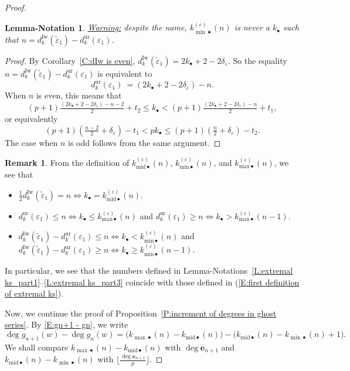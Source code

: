 \documentclass[12pt]{amsart}
\newtheorem{lemmanotation}[subsection]{Lemma-Notation}
\theoremstyle{definition}
\newtheorem{remark}[subsection]{Remark}
\numberwithin{equation}{subsection}
\def\bfe{\mathbf{e}}
\newcommand{\Iw}{\mathrm{Iw}}
\newcommand{\unr}{\mathrm{ur}}
\newcommand{\ur}{\mathrm{ur}}
\newcommand{\midd}{\mathrm{mid}}
\begin{document}
\begin{proof}
\begin{lemmanotation}
\emph{\underline{Warning:} despite the name, $k_{{\min}\bullet}^{(\varepsilon)}(n)$ is never  a $k_\bullet$ such that $n = d_{k}^\Iw(\tilde \varepsilon_1) - d_{k}^\unr(\varepsilon_1)$.}
\end{lemmanotation}
\begin{proof}
By Corollary~\ref{C:dIw is even}, $d_{k}^{\Iw}(\tilde \varepsilon_1) = 2k_\bullet + 2-2\delta_\varepsilon$. So the equality $n = d_{k}^\Iw(\tilde \varepsilon_1)-d_{k}^\unr(\varepsilon_1)$ is equivalent to
$$
d_{k}^\unr(\varepsilon_1)\ =  (2k_\bullet+2-2\delta_\varepsilon)-n.
$$
When $n$ is even, this means that
$$(p+1)\tfrac { (2k_\bullet+2-2\delta_\varepsilon)-n-2}2 + t_2 \leq k_\bullet  < (p+1)\tfrac {(2k_\bullet+2-2\delta_\varepsilon)-n}2 + t_1,
$$
or equivalently
$$ (p+1)( \tfrac {n-2}2 + \delta_\varepsilon) -t_1 < pk_\bullet  \leq (p+1)( \tfrac n2 + \delta_\varepsilon)  -t_2.
$$
The case when $n$ is odd follows from the same argument.
\end{proof}
\begin{remark}
\label{R:meaning of kmidminmax}
From the definition of $k_{\mathrm{mid}\bullet}^{(\varepsilon)}(n)$, $k_{\mathrm{min}\bullet}^{(\varepsilon)}(n)$, and $k^{(\varepsilon)}_{\mathrm{max} \bullet}(n)$, we see that
\begin{itemize}
\item $\frac 12d_k^\Iw(\tilde \varepsilon_1) = n \Leftrightarrow k_\bullet = k_{\mathrm{mid}\bullet}^{(\varepsilon)}(n)$.
\item $d_k^\ur(\varepsilon_1) \leq  n \Leftrightarrow k_\bullet \leq k_{\mathrm{max}\bullet}^{(\varepsilon)}(n)$ and $d_k^\ur(\varepsilon_1) \geq   n \Leftrightarrow k_\bullet > k_{\mathrm{max}\bullet}^{(\varepsilon)}(n-1)$.
\item 
$d_k^\Iw(\tilde \varepsilon_1) - d_k^\ur(\varepsilon_1) \leq  n \Leftrightarrow k_\bullet < k_{\mathrm{min}\bullet}^{(\varepsilon)}(n)$ and $d_k^\Iw(\tilde \varepsilon_1) -d_k^\ur(\varepsilon_1) \geq   n \Leftrightarrow k_\bullet \geq k_{\mathrm{min}\bullet}^{(\varepsilon)}(n-1)$.
\end{itemize}
In particular, we see that the numbers defined in Lemma-Notations~\ref{L:extremal ks_part1}--\ref{L:extremal ks_part3} coincide with those defined in (\ref{E:first definition of extremal ks}).
\end{remark}

Now, we continue the proof of Proposition~\ref{P:increment of degrees in ghost series}.  By \eqref{E:gn+1 - gn}, we write
$$
\deg g_{n+1}(w) - \deg g_n(w) = \big(k_{{\max}\bullet}(n) - k_{\midd \bullet}(n)\big) - \big(k_{\midd \bullet}(n) -  k_{{\min}\bullet}(n)+1 \big).$$
We shall compare $k_{{\max}\bullet}(n)-k_{\midd \bullet}(n)$ with $\deg \bfe_{n+1}$ and   $k_{\midd \bullet}(n)-k_{{\min}\bullet}(n)$ with $\lfloor \frac{\deg\bfe_{n+1}}{p} \rfloor$.


\end{proof}
\end{document}
